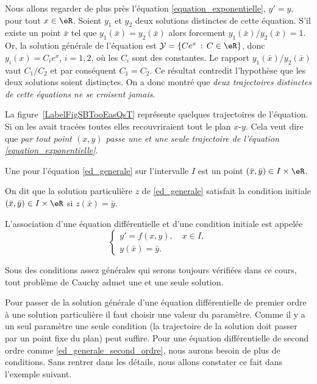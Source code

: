 \begin{example}
  Nous allons regarder de plus près l'équation \eqref{equation_exponentielle}, $y'=y$, pour tout $x\in\eR$. Soient $y_1$ et $y_2$ deux solutions distinctes de cette équation. S'il existe un point $\bar x$ tel que $y_1(\bar x) = y_2 (\bar x)$ alors forcement $y_1(\bar x)/y_2 (\bar x)=1$. Or, la solution générale de l'équation est \(\mathcal{Y} = \{Ce^x\, : \, C\in\eR\}\), donc $y_i(x) = C_ie^x$, $i= 1,2$, o\`u les $C_i$ sont des constantes. Le rapport $y_1(\bar x)/y_2 (\bar x)$ vaut $C_1/C_2$ et par conséquent $C_1 = C_2$. Ce résultat contredit l'hypothèse que les deux solutions soient distinctes. On a donc montré que \emph{deux trajectoires distinctes de cette équations ne se croisent jamais}.

\newcommand{\CaptionFigSBTooEasQsT}{Quelque trajectoires de l'équation \( y'=y\).}


La figure~\ref{LabelFigSBTooEasQsT} représente quelques trajectoires de l'équation. Si on les avait tracées toutes elles recouvriraient tout le plan $x$-$y$. Cela veut dire que \emph{par tout point $(x,y)$ passe une et une seule trajectoire de l'équation \eqref{equation_exponentielle}}.

\end{example}
\begin{definition}
  Une  pour l'équation \eqref{ed_generale} sur l'intervalle \(I\) est un point \((\bar x, \bar y)\in I\times\eR\).

On dit que la solution particulière \(z\) de \eqref{ed_generale} satisfait la condition initiale \((\bar x, \bar y)\in I\times\eR\) si \(z(\bar x) =\bar y\).
\end{definition}
\begin{definition}
  L'association d'une équation différentielle et d'une condition initiale est appelée 
  \begin{equation}\label{plme_cauchy}
    \begin{cases}
      y'= f(x,y), \quad x\in I, \\
      y(\bar x) = \bar y.
    \end{cases}
  \end{equation}
\end{definition}
\begin{remark}
  Sous des conditions assez générales qui serons toujours vérifiées dans ce cours, tout problème de Cauchy admet une et une seule solution.
\end{remark}
Pour passer de la solution générale d'une équation différentielle de premier ordre \`a une solution particulière il faut choisir une valeur du paramètre. Comme il y a un seul paramètre une seule condition (la trajectoire de la solution doit passer par un point fixe du plan) peut suffire. Pour une équation différentielle de second ordre comme \eqref{ed_generale_second_ordre}, nous aurons besoin de plus de conditions. Sans rentrer dans les détails, nous allons constater ce fait dans l'exemple suivant.

